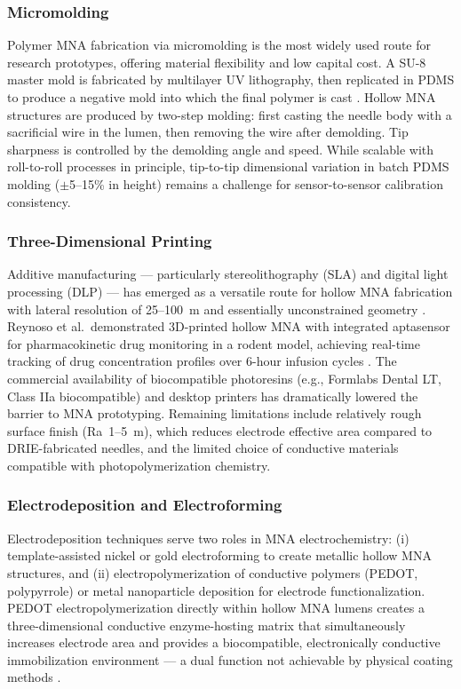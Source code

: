 \documentclass[review,1p]{elsarticle}
\begin{document}
\subsubsection{Micromolding}

Polymer MNA fabrication via micromolding is the most widely used route for research prototypes, offering material flexibility and low capital cost. A SU-8 master mold is fabricated by multilayer UV lithography, then replicated in PDMS to produce a negative mold into which the final polymer is cast \cite{Parrilla2022}. Hollow MNA structures are produced by two-step molding: first casting the needle body with a sacrificial wire in the lumen, then removing the wire after demolding. Tip sharpness is controlled by the demolding angle and speed. While scalable with roll-to-roll processes in principle, tip-to-tip dimensional variation in batch PDMS molding ($\pm$5--15\% in height) remains a challenge for sensor-to-sensor calibration consistency.

\subsubsection{Three-Dimensional Printing}

Additive manufacturing — particularly stereolithography (SLA) and digital light processing (DLP) — has emerged as a versatile route for hollow MNA fabrication with lateral resolution of 25--100~\textmu{}m and essentially unconstrained geometry \cite{Reynoso2024}. Reynoso et al.\ demonstrated 3D-printed hollow MNA with integrated aptasensor for pharmacokinetic drug monitoring in a rodent model, achieving real-time tracking of drug concentration profiles over 6-hour infusion cycles \cite{Reynoso2024}. The commercial availability of biocompatible photoresins (e.g., Formlabs Dental LT, Class IIa biocompatible) and desktop printers has dramatically lowered the barrier to MNA prototyping. Remaining limitations include relatively rough surface finish (Ra~1--5~\textmu{}m), which reduces electrode effective area compared to DRIE-fabricated needles, and the limited choice of conductive materials compatible with photopolymerization chemistry.

\subsubsection{Electrodeposition and Electroforming}

Electrodeposition techniques serve two roles in MNA electrochemistry: (i) template-assisted nickel or gold electroforming to create metallic hollow MNA structures, and (ii) electropolymerization of conductive polymers (PEDOT, polypyrrole) or metal nanoparticle deposition for electrode functionalization. PEDOT electropolymerization directly within hollow MNA lumens creates a three-dimensional conductive enzyme-hosting matrix that simultaneously increases electrode area and provides a biocompatible, electronically conductive immobilization environment — a dual function not achievable by physical coating methods \cite{Sharma2022AFE}.
\end{document}
